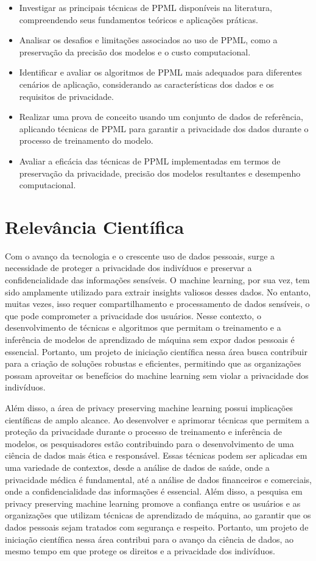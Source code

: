 \documentclass{article}
\begin{document}
\begin{itemize}
  \item Investigar as principais técnicas de PPML disponíveis na literatura, compreendendo seus fundamentos teóricos e aplicações práticas.
  \item Analisar os desafios e limitações associados ao uso de PPML, como a preservação da precisão dos modelos e o custo computacional.
  \item Identificar e avaliar os algoritmos de PPML mais adequados para diferentes cenários de aplicação, considerando as características dos dados e os requisitos de privacidade.
  \item Realizar uma prova de conceito usando um conjunto de dados de referência, aplicando técnicas de PPML para garantir a privacidade dos dados durante o processo de treinamento do modelo.
  \item Avaliar a eficácia das técnicas de PPML implementadas em termos de preservação da privacidade, precisão dos modelos resultantes e desempenho computacional.
\end{itemize}

\section{Relevância Científica}

Com o avanço da tecnologia e o crescente uso de dados pessoais, surge a necessidade de proteger a privacidade dos indivíduos e preservar a confidencialidade das informações sensíveis. O machine learning, por sua vez, tem sido amplamente utilizado para extrair insights valiosos desses dados. No entanto, muitas vezes, isso requer compartilhamento e processamento de dados sensíveis, o que pode comprometer a privacidade dos usuários. Nesse contexto, o desenvolvimento de técnicas e algoritmos que permitam o treinamento e a inferência de modelos de aprendizado de máquina sem expor dados pessoais é essencial. Portanto, um projeto de iniciação científica nessa área busca contribuir para a criação de soluções robustas e eficientes, permitindo que as organizações possam aproveitar os benefícios do machine learning sem violar a privacidade dos indivíduos.

Além disso, a área de privacy preserving machine learning possui implicações científicas de amplo alcance. Ao desenvolver e aprimorar técnicas que permitem a proteção da privacidade durante o processo de treinamento e inferência de modelos, os pesquisadores estão contribuindo para o desenvolvimento de uma ciência de dados mais ética e responsável. Essas técnicas podem ser aplicadas em uma variedade de contextos, desde a análise de dados de saúde, onde a privacidade médica é fundamental, até a análise de dados financeiros e comerciais, onde a confidencialidade das informações é essencial. Além disso, a pesquisa em privacy preserving machine learning promove a confiança entre os usuários e as organizações que utilizam técnicas de aprendizado de máquina, ao garantir que os dados pessoais sejam tratados com segurança e respeito. Portanto, um projeto de iniciação científica nessa área contribui para o avanço da ciência de dados, ao mesmo tempo em que protege os direitos e a privacidade dos indivíduos.
\end{document}
